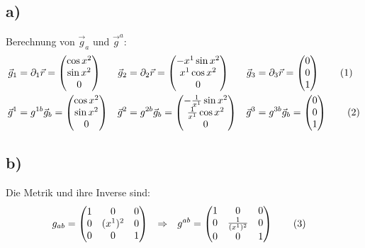 \documentclass[a4paper,12pt]{article}
\newcommand\numberthis{\addtocounter{equation}{1}\tag{\theequation}}
\begin{document}
\subsection*{a)}Berechnung von $\vec{g}_a$ und $\vec{g}^a$:
\begin{align*}
\vec{g}_1&=\partial_1\vec{r}=\begin{pmatrix}
\cos x^2 \\ \sin x^2 \\ 0
\end{pmatrix} &\vec{g}_2&=\partial_2\vec{r}=\begin{pmatrix}
-x^1\sin x^2 \\ x^1\cos x^2 \\ 0
\end{pmatrix}&\vec{g}_3&=\partial_3\vec{r}=\begin{pmatrix}
0 \\ 0 \\ 1
\end{pmatrix} \numberthis\label{eqn:zylinder:g unten a}\\
\vec{g}^1&=g^{1b}\vec{g}_b=\begin{pmatrix}
\cos x^2 \\ \sin x^2 \\ 0
\end{pmatrix}&\vec{g}^2&=g^{2b}\vec{g}_b=\begin{pmatrix}
-\frac{1}{x^1}\sin x^2 \\ \frac{1}{x^1}\cos x^2 \\ 0
\end{pmatrix}&\vec{g}^3&=g^{3b}\vec{g}_b=\begin{pmatrix}
0 \\ 0 \\ 1
\end{pmatrix}\numberthis\label{eqn:zylinder:g oben a}
\end{align*}
\subsection*{b)}Die Metrik und ihre Inverse sind:
\begin{align*}
g_{ab}&=\begin{pmatrix}
1&0&0 \\ 0&(x^1)^2&0 \\ 0&0&1
\end{pmatrix}&\Rightarrow&&g^{ab}&=\begin{pmatrix}
1&0&0 \\ 0&\frac{1}{(x^1)^2}&0 \\ 0&0&1
\end{pmatrix}\numberthis\label{eqn:zylinder:Metrik}
\end{align*}
\end{document}
